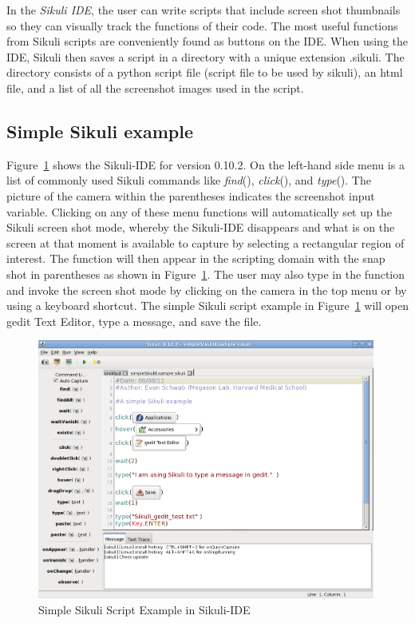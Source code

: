 \documentclass{InsightArticle}
\begin{document}
In the \emph{Sikuli IDE}, the user can write scripts that include screen shot
thumbnails so they can visually track the functions of their code. The most
useful functions from Sikuli scripts are conveniently found as
buttons on the IDE. When using the IDE, Sikuli then saves a script in a
directory with a unique extension .sikuli. The directory consists of a python
script file (script file to be used by sikuli), an html file, and a list of all
the screenshot images used in the script.


\subsection{Simple Sikuli example} %

Figure~\ref{fig:SimpleExample} shows the Sikuli-IDE for version 0.10.2. On the
left-hand side menu is a list of commonly used Sikuli commands
like \emph{find}(), \emph{click}(), and \emph{type}(). The picture of
the camera within the parentheses indicates the screenshot input variable.
Clicking on any of these menu functions will automatically set up the Sikuli
screen shot mode, whereby the Sikuli-IDE disappears and what is on the screen at
that moment is available to capture by selecting a rectangular region of
interest. The function will then appear in the scripting domain with the snap
shot in parentheses as shown in Figure~\ref{fig:SimpleExample}. The user may
also type in the function and invoke the screen shot mode by clicking on the
camera in the top menu or by using a keyboard shortcut. The simple Sikuli script
example in Figure~\ref{fig:SimpleExample} will open gedit Text Editor, type a
message, and save the file.

\begin{figure}[htbp]
 \centering
 \includegraphics[width=0.99\textwidth]{Images/SimpleSikuliExample.png}
 \caption{Simple Sikuli Script Example in Sikuli-IDE}
 \label{fig:SimpleExample}
\end{figure}
\end{document}
